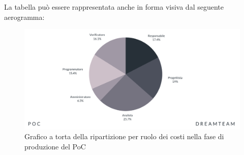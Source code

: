 La tabella può essere rappresentata anche in forma visiva dal seguente aerogramma:

\begin{figure}[H]
\centering
\includegraphics[scale=0.65]{Sezioni/SezioniPreventivo/grafici/Poc_costi.png}
\caption{Grafico a torta della ripartizione per ruolo dei costi nella fase di produzione del PoC}
\end{figure}